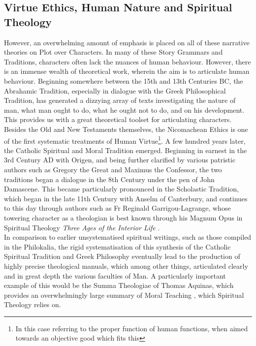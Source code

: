 \documentclass[11pt]{article}
\begin{document}
\subsection{Virtue Ethics, Human Nature and Spiritual Theology}
However, an overwhelming amount of emphasis is placed on all of these narrative theories on Plot over Characters. In many of these Story Grammars and Traditions, characters often lack the nuances of human behaviour. However, there is an immense wealth of theoretical work, wherein the aim is to articulate human behaviour. Beginning somewhere between the 15th and 13th Centuries BC, the Abrahamic Tradition, especially in dialogue with the Greek Philosophical Tradition, has generated a dizzying array of texts investigating the nature of man, what man ought to do, what he ought not to do, and on his development. This provides us with a great theoretical toolset for articulating characters. \\

Besides the Old and New Testaments themselves, the Nicomachean Ethics \cite{340BCEthicsAristotleNicomachean} is one of the first systematic treatments of Human Virtue\footnote{In this case referring to the proper function of human functions, when aimed towards an objective good which fits this}. A few hundred years later, the Catholic Spiritual and Moral Tradition emerged. Beginning in earnest in the 3rd Century AD with Origen\cite{bergsma2018catholic}, and being further clarified by various patristic authors such as Gregory the Great and Maximus the Confessor, the two traditions began a dialogue in the 8th Century under the pen of John Damascene. This became particularly pronounced in the Scholastic Tradition, which began in the late 11th Century with Anselm of Canterbury, and continues to this day through authors such as Fr Reginald Garrigou-Lagrange, whose towering character as a theologian is best known through his Magnum Opus in Spiritual Theology \: \textit{Three Ages of the Interior Life} \cite{garrigou2013three}. \\

In comparison to earlier unsystematised spiritual writings, such as those compiled in the Philokalia\cite{1983philokalia}, the rigid systematisation of this synthesis of the Catholic Spiritual Tradition and Greek Philosophy eventually lead to the production of highly precise theological manuals, which among other things, articulated clearly and in great depth the various faculties of Man. A particularly important example of this would be the Summa Theologiae of Thomas Aquinas, which provides an overwhelmingly large summary of Moral Teaching \cite{aquinas2014summa}, which Spiritual Theology relies on.
\end{document}
